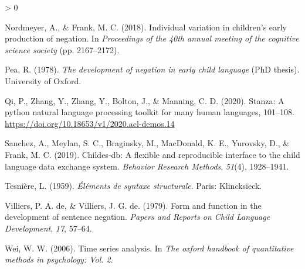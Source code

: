 \documentclass[
  english,
  man,floatsintext]{apa6}
\newlength{\cslhangindent}
\newenvironment{CSLReferences}[2] %
 {%
  \setlength{\parindent}{0pt}
  \ifodd #1 \everypar{\setlength{\hangindent}{\cslhangindent}}\ignorespaces\fi
  \ifnum #2 > 0
  \setlength{\parskip}{#2\baselineskip}
  \fi
 }%
 {}
\begin{document}
\begin{CSLReferences}{1}{0}
\leavevmode\hypertarget{ref-nordmeyer2018individual}{}%
Nordmeyer, A., \& Frank, M. C. (2018). Individual variation in children's early production of negation. In \emph{Proceedings of the 40th annual meeting of the cognitive science society} (pp. 2167--2172).

\leavevmode\hypertarget{ref-pea1978}{}%
Pea, R. (1978). \emph{The development of negation in early child language} (PhD thesis). University of Oxford.

\leavevmode\hypertarget{ref-qi-etal-2020-stanza}{}%
Qi, P., Zhang, Y., Zhang, Y., Bolton, J., \& Manning, C. D. (2020). {S}tanza: A python natural language processing toolkit for many human languages, 101--108. \url{https://doi.org/10.18653/v1/2020.acl-demos.14}

\leavevmode\hypertarget{ref-sanchez2019childes}{}%
Sanchez, A., Meylan, S. C., Braginsky, M., MacDonald, K. E., Yurovsky, D., \& Frank, M. C. (2019). Childes-db: A flexible and reproducible interface to the child language data exchange system. \emph{Behavior Research Methods}, \emph{51}(4), 1928--1941.

\leavevmode\hypertarget{ref-dg}{}%
Tesnière, L. (1959). \emph{Éléments de syntaxe structurale}. Paris: Klincksieck.

\leavevmode\hypertarget{ref-de1979form}{}%
Villiers, P. A. de, \& Villiers, J. G. de. (1979). Form and function in the development of sentence negation. \emph{Papers and Reports on Child Language Development}, \emph{17}, 57--64.

\leavevmode\hypertarget{ref-wei2006time}{}%
Wei, W. W. (2006). Time series analysis. In \emph{The oxford handbook of quantitative methods in psychology: Vol. 2}.

\end{CSLReferences}
\end{document}
